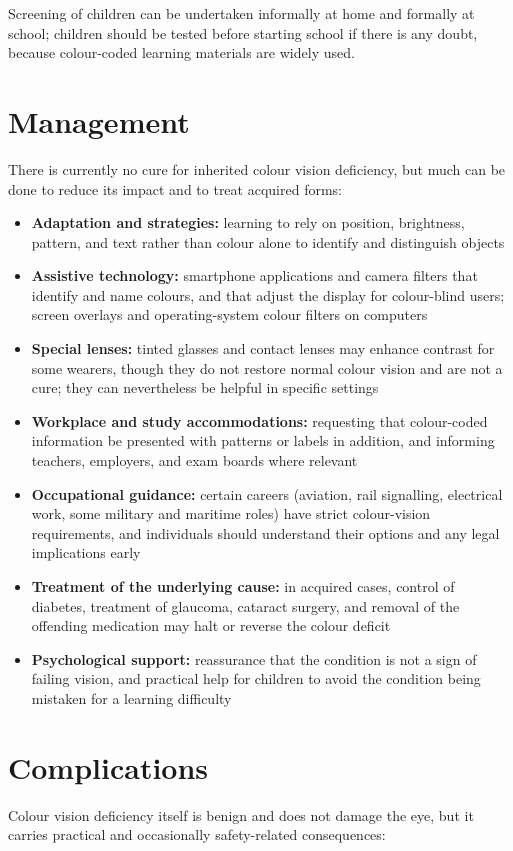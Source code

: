 Screening of children can be undertaken informally at home and formally at school; children should be tested before starting school if there is any doubt, because colour-coded learning materials are widely used.

\section*{Management}
There is currently no cure for inherited colour vision deficiency, but much can be done to reduce its impact and to treat acquired forms:

\begin{itemize}
    \item \textbf{Adaptation and strategies:} learning to rely on position, brightness, pattern, and text rather than colour alone to identify and distinguish objects
    \item \textbf{Assistive technology:} smartphone applications and camera filters that identify and name colours, and that adjust the display for colour-blind users; screen overlays and operating-system colour filters on computers
    \item \textbf{Special lenses:} tinted glasses and contact lenses may enhance contrast for some wearers, though they do not restore normal colour vision and are not a cure; they can nevertheless be helpful in specific settings
    \item \textbf{Workplace and study accommodations:} requesting that colour-coded information be presented with patterns or labels in addition, and informing teachers, employers, and exam boards where relevant
    \item \textbf{Occupational guidance:} certain careers (aviation, rail signalling, electrical work, some military and maritime roles) have strict colour-vision requirements, and individuals should understand their options and any legal implications early
    \item \textbf{Treatment of the underlying cause:} in acquired cases, control of diabetes, treatment of glaucoma, cataract surgery, and removal of the offending medication may halt or reverse the colour deficit
    \item \textbf{Psychological support:} reassurance that the condition is not a sign of failing vision, and practical help for children to avoid the condition being mistaken for a learning difficulty
\end{itemize}

\section*{Complications}
Colour vision deficiency itself is benign and does not damage the eye, but it carries practical and occasionally safety-related consequences:

